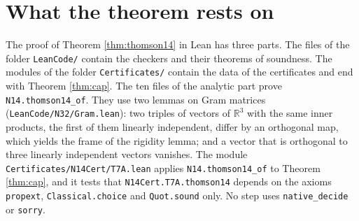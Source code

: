 \documentclass[reqno,a4paper,11pt]{amsart}
\newcommand{\R}{\mathbb{R}}
\newcommand{\lean}[1]{\texttt{#1}}
\newcommand{\file}[1]{\nolinkurl{#1}}
\begin{document}
\section{What the theorem rests on}

The proof of Theorem \ref{thm:thomson14} in Lean has three parts. The files of the folder \file{LeanCode/} contain the checkers and their theorems of soundness. The modules of the folder \file{Certificates/} contain the data of the certificates and end with Theorem \ref{thm:cap}. The ten files of the analytic part prove \lean{N14.thomson14\_of}. They use two lemmas on Gram matrices (\file{LeanCode/N32/Gram.lean}): two triples of vectors of $\R^3$ with the same inner products, the first of them linearly independent, differ by an orthogonal map, which yields the frame of the rigidity lemma; and a vector that is orthogonal to three linearly independent vectors vanishes. The module \file{Certificates/N14Cert/T7A.lean} applies \lean{N14.thomson14\_of} to Theorem \ref{thm:cap}, and it tests that \lean{N14Cert.T7A.thomson14} depends on the axioms \lean{propext}, \lean{Classical.choice} and \lean{Quot.sound} only. No step uses \lean{native\_decide} or \lean{sorry}.
\end{document}
